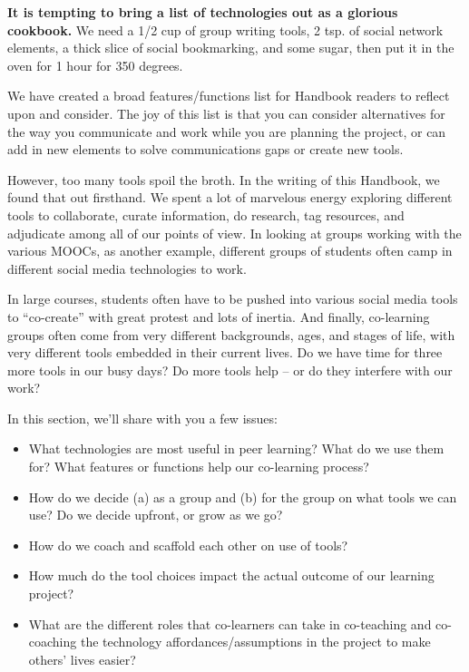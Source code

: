 \textbf{It is tempting to bring a list of technologies out as a glorious
cookbook.} We need a 1/2 cup of group writing tools, 2 tsp. of social
network elements, a thick slice of social bookmarking, and some sugar,
then put it in the oven for 1 hour for 350 degrees.

We have created a broad features/functions list for Handbook readers to
reflect upon and consider. The joy of this list is that you can consider
alternatives for the way you communicate and work while you are planning
the project, or can add in new elements to solve communications gaps or
create new tools.

However, too many tools spoil the broth. In the writing of this
Handbook, we found that out firsthand. We spent a lot of marvelous
energy exploring different tools to collaborate, curate information, do
research, tag resources, and adjudicate among all of our points of view.
In looking at groups working with the various MOOCs, as another example,
different groups of students often camp in different social media
technologies to work.

In large courses, students often have to be pushed into various social
media tools to ``co-create'' with great protest and lots of inertia. And
finally, co-learning groups often come from very different backgrounds,
ages, and stages of life, with very different tools embedded in their
current lives. Do we have time for three more tools in our busy days? Do
more tools help -- or do they interfere with our work?

In this section, we'll share with you a few issues:

\begin{itemize}
\tightlist
\item
  What technologies are most useful in peer learning? What do we use
  them for? What features or functions help our co-learning process?
\item
  How do we decide (a) as a group and (b) for the group on what tools we
  can use? Do we decide upfront, or grow as we go?
\item
  How do we coach and scaffold each other on use of tools?
\item
  How much do the tool choices impact the actual outcome of our learning
  project?
\item
  What are the different roles that co-learners can take in co-teaching
  and co-coaching the technology affordances/assumptions in the project
  to make others' lives easier?
\end{itemize}

